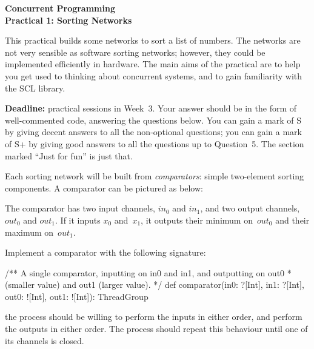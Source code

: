 \documentclass[12pt,a4paper]{article}
\begin{document}
\begin{center}
\LARGE\bf Concurrent Programming \\
\Large Practical 1: Sorting Networks
\end{center}

This practical builds some networks to sort a list of numbers.  The networks
are not very sensible as software sorting networks; however, they could be
implemented efficiently in hardware.  The main aims of the practical are to
help you get used to thinking about concurrent systems, and to gain familiarity
with the SCL library.

\textbf{Deadline:}  practical sessions in Week~3. 
Your answer should be in the form of well-commented code, answering the
questions below.  You can gain a mark of S by giving decent answers to all the
non-optional questions; you can gain a mark of S+ by giving good answers to
all the questions up to Question~5.  The section marked ``Just for fun'' is
just that.


Each sorting network will be built from \emph{comparators}: simple
two-element sorting components.  A comparator can be pictured as below: 
%
\begin{center}
\end{center}
%
The comparator has two input channels, $in_0$ and $in_1$, and two output
channels, $out_0$ and $out_1$.  If it inputs $x_0$ and~$x_1$, it outputs their
minimum on~$out_0$ and their maximum on~$out_1$.
\begin{question}
Implement a comparator with the following signature:
%
\begin{scala}
  /** A single comparator, inputting on in0 and in1, and outputting on out0
    * (smaller value) and out1 (larger value). */
  def comparator(in0: ?[Int], in1: ?[Int], out0: ![Int], out1: ![Int]): ThreadGroup
\end{scala}
%
the process should be willing to perform the inputs in either order, and
perform the outputs in either order.  The process should repeat this behaviour
until one of its channels is closed. 
\end{question}
\end{document}
